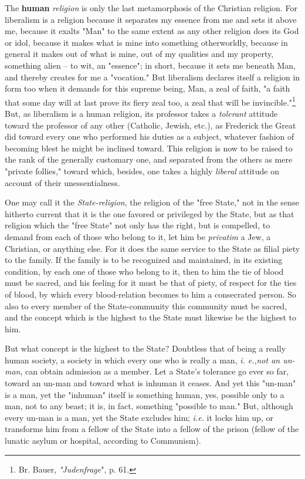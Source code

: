 \documentclass[a4paper]{book}
\begin{document}
The \textbf{human} \textit{religion} is only the last metamorphosis of the 
Christian religion. For liberalism is a religion because it separates my 
essence from me and sets it above me, because it exalts "{}Man"{} to the same 
extent as any other religion does its God or idol, because it makes what is 
mine into something otherworldly, because in general it makes out of what is 
mine, out of my qualities and my property, something alien -- to wit, an 
"{}essence"{}; in short, because it sets me beneath Man, and thereby creates 
for me a "{}vocation."{} But liberalism declares itself a religion in form too 
when it demands for this supreme being, Man, a zeal of faith, "{}a faith that 
some day will at last prove its fiery zeal too, a zeal that will be 
invincible."{}\footnote{Br. Bauer, \textit{"{}Judenfrage}"{}, p. 61.} But, as 
liberalism is a human religion, its professor takes a \textit{tolerant} 
attitude toward the professor of any other (Catholic, Jewish, etc.), as 
Frederick the Great did toward every one who performed his duties as a 
subject, whatever fashion of becoming blest he might be inclined toward. This 
religion is now to be raised to the rank of the generally customary one, and 
separated from the others as mere "{}private follies,"{} toward which, 
besides, one takes a highly \textit{liberal} attitude on account of their 
unessentialness.

One may call it the \textit{State-religion}, the religion of the "{}free 
State,"{} not in the sense hitherto current that it is the one favored or 
privileged by the State, but as that religion which the "{}free State"{} not 
only has the right, but is compelled, to demand from each of those who belong 
to it, let him be \textit{privatim} a Jew, a Christian, or anything else. For 
it does the same service to the State as filial piety to the family. If the 
family is to be recognized and maintained, in its existing condition, by each 
one of those who belong to it, then to him the tie of blood must be sacred, 
and his feeling for it must be that of piety, of respect for the ties of 
blood, by which every blood-relation becomes to him a consecrated person. So 
also to every member of the State-community this community must be sacred, and 
the concept which is the highest to the State must likewise be the highest to 
him.

But what concept is the highest to the State? Doubtless that of being a really 
human society, a society in which every one who is really a man, \textit{i. 
e.},\textit{not an un-man}, can obtain admission as a member. Let a State's 
tolerance go ever so far, toward an un-man and toward what is inhuman it 
ceases. And yet this "{}un-man"{} is a man, yet the "{}inhuman"{} itself is 
something human, yes, possible only to a man, not to any beast; it is, in 
fact, something "{}possible to man."{} But, although every un-man is a man, 
yet the State excludes him; \textit{i.e.} it locks him up, or transforms him 
from a fellow of the State into a fellow of the prison (fellow of the lunatic 
asylum or hospital, according to Communism).
\end{document}
